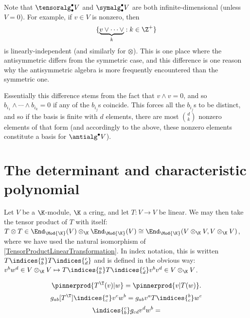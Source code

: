 Note that $\tensoralg _{\bullet}^{\bullet}V$ and $\symalg _{\bullet}^{\bullet}V$ are both infinite-dimensional (unless $V=0$).  For example, if $v\in V$ is nonzero, then
\begin{equation}
	\{ \underbrace{v\vee \cdots \vee}_k:k\in \Z ^+\}
\end{equation}
is linearly-independent (and similarly for $\otimes$).  This is one place where the antisymmetric differs from the symmetric case, and this difference is one reason why the antisymmetric algebra is more frequently encountered than the symmetric one.

Essentially this difference stems from the fact that $v\wedge v=0$, and so $b_{i_1}\wedge \cdots \wedge b_{i_k}=0$ if any of the $b_{i_j}$s coincide.  This forces all the $b_{i_j}$s to be distinct, and so if the basis is finite with $d$ elements, there are most $\binom{d}{k}$ nonzero elements of that form (and accordingly to the above, these nonzero elements constitute a basis for $\antialg ^{\bullet}V$). 

\section{The determinant and characteristic polynomial}

Let $V$ be a $\K$-module, $\K$ a cring, and let $T\colon V\rightarrow V$ be linear.  We may then take the tensor product of $T$ with itself:  $T\otimes T\in \End _{\Mod{\K}}(V)\otimes _{\K}\End _{\Mod{\K}}(V)\cong \End _{\Mod{\K}}(V\otimes _{\K}V,V\otimes _{\K}V)$, where we have used the natural isomorphism of \cref{TensorProductLinearTransformation}.  In index notation, this is written $T\indices{^a_b}T\indices{^c_d}$ and is defined in the obvious way:  $v^bw^d\in V\otimes _{\K}V\mapsto T\indices{^a_b}T\indices{^c_d}v^bv^d\in V\otimes _{\K}V$.

\begin{equation}
	\pinnerprod{T^{\T}(v)|w}=\pinnerprod{v|T(w)}.
\end{equation}
\begin{equation}
	g_{ab}[T^{\T}]\indices{^a_c}v^cw^b=g_{ab}v^aT\indices{^b_c}w^c
\end{equation}
\begin{equation}
	[T^{\T}]\indices{_b^c}g_{cd}v^dw^b=
\end{equation}